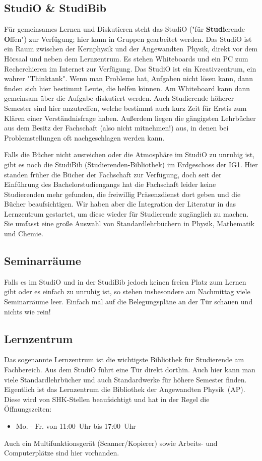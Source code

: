 \begin{multicols}{2}
\subsection{StudiO \& StudiBib}
Für gemeinsames Lernen und Diskutieren steht das StudiO ("für \textbf{Studi}erende \textbf{O}ffen") zur Verfügung; hier kann in Gruppen gearbeitet werden.
Das StudiO ist ein Raum zwischen der Kernphysik und der Angewandten~Physik, direkt vor dem Hörsaal und neben dem Lernzentrum.
Es stehen Whiteboards und ein PC zum Recherchieren im Internet zur Verfügung.
Das StudiO ist ein Kreativzentrum, ein wahrer "Thinktank".
Wenn man Probleme hat, Aufgaben nicht lösen kann, dann finden sich hier bestimmt Leute, die helfen können.
Am Whiteboard kann dann gemeinsam über die Aufgabe diskutiert werden.
Auch Studierende höherer Semester sind hier anzutreffen, welche bestimmt auch kurz Zeit für Erstis zum Klären einer Verständnisfrage haben.
Außerdem liegen die gängigsten Lehrbücher aus dem Besitz der Fachschaft (also nicht mitnehmen!) aus, in denen bei Problemstellungen oft nachgeschlagen werden kann.

Falls die Bücher nicht ausreichen oder die Atmosphäre im StudiO zu unruhig ist, gibt es noch die StudiBib (Studierenden-Bibliothek) im Erdgeschoss der IG1.
Hier standen früher die Bücher der Fachschaft zur Verfügung, doch seit der Einführung des Bachelorstudiengangs hat die Fachschaft leider keine Studierenden mehr gefunden, die freiwillig Präsenzdienst dort geben und die Bücher beaufsichtigen.
Wir haben aber die Integration der Literatur in das Lernzentrum gestartet, um diese wieder für Studierende zugänglich zu machen.
Sie umfasst eine große Auswahl von Standardlehrbüchern in Physik, Mathematik und Chemie.

\subsection{Seminarräume}
Falls es im StudiO und in der StudiBib jedoch keinen freien Platz zum Lernen gibt oder es einfach zu unruhig ist, so stehen insbesondere am Nachmittag viele Seminarräume leer.
Einfach mal auf die Belegungspläne an der Tür schauen und nichts wie rein!

\subsection{Lernzentrum}
Das sogenannte Lernzentrum ist die wichtigste Bibliothek für Studierende am Fachbereich.
Aus dem StudiO führt eine Tür direkt dorthin.
Auch hier kann man viele Standardlehrbücher und auch Standardwerke für höhere Semester finden.
Eigentlich ist das Lernzentrum die Bibliothek der Angewandten Physik~(AP).
Diese wird von SHK-Stellen beaufsichtigt und hat in der Regel die Öffnungszeiten:
\begin{itemize}
	\item Mo. - Fr. von 11:00~Uhr bis 17:00~Uhr 
\end{itemize}
Auch ein Multifunktionsgerät (Scanner/Kopierer) sowie Arbeits- und Computerplätze sind hier vorhanden.


\end{multicols}
